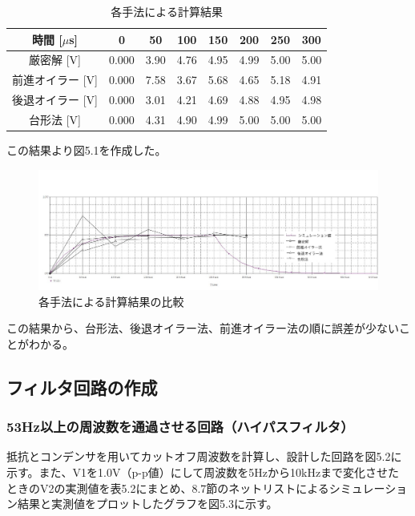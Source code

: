 \documentclass{jlreq}
\numberwithin{equation}{section}
\begin{document}
\begin{table}[H]
  \centering
  \caption{各手法による計算結果}
  \begin{tabular}{|c|c|c|c|c|c|c|c|}
    \hline
    時間 [\(\mu\)s] & 0 & 50 & 100 & 150 & 200 & 250 & 300 \\ \hline
    厳密解 [V] & 0.000 & 3.90 & 4.76 & 4.95 & 4.99 & 5.00 & 5.00 \\ \hline
    前進オイラー [V] & 0.000 & 7.58 & 3.67 & 5.68 & 4.65 & 5.18 & 4.91 \\ \hline
    後退オイラー [V] & 0.000 & 3.01 & 4.21 & 4.69 & 4.88 & 4.95 & 4.98 \\ \hline
    台形法 [V] & 0.000 & 4.31 & 4.90 & 4.99 & 5.00 & 5.00 & 5.00 \\ \hline
  \end{tabular}
\end{table}

この結果より図5.1を作成した。

\begin{figure}[H]
  \centering
  \includegraphics[width=\textwidth]{assets/katohikakuplot.jpg}
  \caption{各手法による計算結果の比較}
\end{figure}

この結果から、台形法、後退オイラー法、前進オイラー法の順に誤差が少ないことがわかる。

\subsection{フィルタ回路の作成}
\subsubsection{53Hz以上の周波数を通過させる回路（ハイパスフィルタ）}
抵抗とコンデンサを用いてカットオフ周波数を計算し、設計した回路を図5.2に示す。また、V1を1.0V（p-p値）にして周波数を5Hzから10kHzまで変化させたときのV2の実測値を表5.2にまとめ、8.7節のネットリストによるシミュレーション結果と実測値をプロットしたグラフを図5.3に示す。
\end{document}
